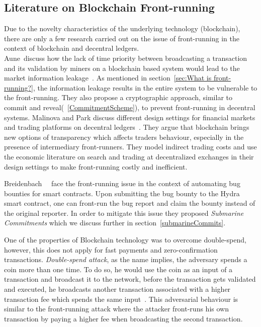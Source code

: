 \subsection{Literature on Blockchain Front-running}

Due to the novelty characteristics of the underlying technology (blockchain), there are only a few research carried out on the issue of front-running in the context of blockchain and decentral ledgers. \\
Aune~\etal discuss how the lack of time priority between broadcasting a transaction and its validation by miners on a blockchain based system would lead to the market information leakage~\cite{aune2017footprints}. As mentioned in section~\ref{sec:What is front-running?}, the information leakage results in the entire system to be vulnerable to the front-running. They also propose a cryptographic approach, similar to commit and reveal(~\ref{CommitmentScheme}), to prevent front-running in decentral systems. %
Malinova and Park discuss different design settings for financial markets and trading platforms on decentral ledgers~\cite{malinova2017market}. They argue that blockchain brings new options of transparency which affects traders behaviour, especially in the presence of intermediary front-runners. They model indirect trading costs and use the economic literature on search and trading at decentralized exchanges in their design settings to make front-running costly and inefficient.

Breidenbach~\etal~\cite{breidenbach2018enter} face the front-running issue in the context of automating bug bounties for smart contracts. Upon submitting the bug bounty to the Hydra smart contract, one can front-run the bug report and claim the bounty instead of the original reporter. In order to mitigate this issue they proposed \textit{Submarine Commitments} which we discuss further in section~\ref{submarineCommits}.

One of the properties of Blockchain technology was to overcome double-spend, however, this does not apply for fast payments and zero-confirmation transactions. \textit{Double-spend attack}, as the name implies, the adversary spends a coin more than one time. To do so, he would use the coin as an input of a transaction and broadcast it to the network, before the transaction gets validated and executed, he broadcasts another transaction associated with a higher transaction fee which spends the same input~\cite{bamert2013have, karame2012double}. This adversarial behaviour is similar to the front-running attack where the attacker front-runs his own transaction by paying a higher fee when broadcasting the second transaction.

